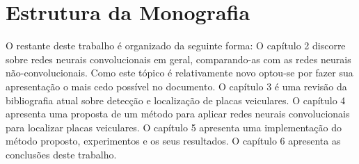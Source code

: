 \section{Estrutura da Monografia}
O restante deste trabalho é organizado da seguinte forma: O
capítulo 2 discorre sobre redes neurais convolucionais em geral,
comparando-as com as redes neurais não-convolucionais. Como este
tópico é relativamente novo optou-se por fazer sua apresentação
o mais cedo possível no documento. O capítulo 3 é uma revisão da
bibliografia atual sobre detecção e localização de placas veiculares. O
capítulo 4 apresenta uma proposta de um método para aplicar redes neurais
convolucionais para localizar placas veiculares. O capítulo 5 apresenta uma
implementação do método proposto, experimentos e os seus resultados. O
capítulo 6 apresenta as conclusões deste trabalho.

